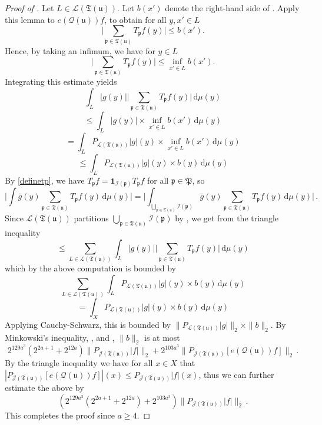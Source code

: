 \documentclass[10pt,a4paper]{article}
\theoremstyle{plain}
\theoremstyle{definition}
\numberwithin{equation}{subsection}
\newcommand{\fp}{{\mathfrak p}}
\newcommand{\fP}{{\mathfrak P}}
\newcommand{\fu}{{\mathfrak u}}
\newcommand{\fT}{{\mathfrak T}}
\newcommand{\scI}{{\mathcal{I}}} %
\newcommand{\fcc}{{\mathcal{Q}}}
\newcommand{\proves}[1]{}
\newcommand{\leanok}{}
\begin{document}
\begin{proof}[Proof of ]
    \proves{tree-projection-estimate}\leanok
    Let $L \in \mathcal{L}(\fT(\fu))$.
    Let $b(x')$ denote the right-hand side of . Apply this lemma to $e(\fcc(\fu)) f$, to obtain for all $y, x' \in L$
    $$
        \Bigg| \sum_{\fp \in \fT(\fu)} T_{\fp} f(y) \Bigg| \le b(x').
    $$
    Hence, by taking an infimum, we have for $y \in L$
    $$
        \Bigg| \sum_{\fp \in \fT(\fu)} T_{\fp} f(y) \Bigg| \le \inf_{x' \in L} b(x').
    $$
    Integrating this estimate yields
    $$
        \int_L |g(y)| \Bigg| \sum_{\fp \in \fT(\fu)} T_{\fp} f(y) \Bigg| \, \mathrm{d}\mu(y)
    $$
    $$
        \le \int_L |g(y)| \times \inf_{x' \in L} b(x') \, \mathrm{d}\mu(y)
    $$
    $$
        =   \int_L P_{\mathcal{L}(\fT(\fu))}|g|(y) \times \inf_{x' \in L} b(x') \, \mathrm{d}\mu(y)
    $$
    $$
        \le \int_L P_{\mathcal{L}(\fT(\fu))}|g|(y) \times  b(y) \, \mathrm{d}\mu(y)
    $$
    By \eqref{definetp}, we have $T_{\fp} f = \mathbf{1}_{\scI(\fp)} T_{\fp} f$ for all $\fp \in \fP$, so
    $$
        \Bigg| \int \bar g(y) \sum_{\fp \in \fT(\fu)} T_{\fp} f(y) \, \mathrm{d}\mu(y) \Bigg| = \Bigg| \int_{\bigcup_{\fp \in \fT(\fu)} \scI(\fp)} \bar g(y) \sum_{\fp \in \fT(\fu)} T_{\fp} f(y) \, \mathrm{d}\mu(y) \Bigg|\,.
    $$
    Since $\mathcal{L}(\fT(\fu))$ partitions $\bigcup_{\fp \in \fT(\fu)} \scI(\fp)$ by ,
    we get from the triangle inequality
    $$
        \le \sum_{L \in \mathcal{L}(\fT(\fu))} \int_L |g(y)| \Bigg| \sum_{\fp \in \fT(\fu)} T_{\fp} f(y) \Bigg| \, \mathrm{d}\mu(y)
    $$
    which by the above computation is bounded by
    $$
        \sum_{L \in \mathcal{L}(\fT(\fu))} \int_L P_{\mathcal{L}(\fT(\fu))}|g|(y) \times  b(y) \, \mathrm{d}\mu(y)
    $$
    $$
        = \int_X P_{\mathcal{L}(\fT(\fu))}|g|(y) \times  b(y) \, \mathrm{d}\mu(y)
    $$
    Applying Cauchy-Schwarz, this is bounded by $\|P_{\mathcal{L}(\fT(\fu))}|g|\|_2 \times \|b\|_2$.
    By Minkowski's inequality, ,  and , $\|b\|_2$ is at most
    $$
        2^{129a^3} (2^{2a+1} + 2^{12a})\|P_{\mathcal{J}(\fT(\fu))}|f|\|_2 + 2^{103a^3} \|P_{\mathcal{J}(\fT(\fu))}[e(\fcc(\fu))f]\|_2\,.
    $$
    By the triangle inequality we have for all $x \in X$ that $|P_{\mathcal{J}(\fT(\fu))}[e(\fcc(\fu))f]|(x) \le P_{\mathcal{J}(\fT(\fu))}|f|(x)$, thus we can further estimate the above by
    $$
        (2^{129a^3} (2^{2a+1} + 2^{12a}) + 2^{103a^3}) \|P_{\mathcal{J}(\fT(\fu))}|f|\|_2\,.
    $$
    This completes the proof since $a \ge 4$.
\end{proof}
\end{document}
